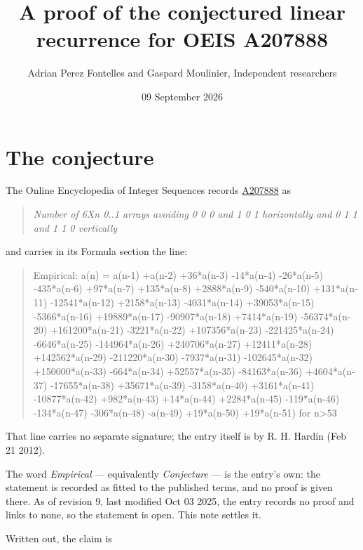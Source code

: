 \documentclass[11pt]{article}
\title{A proof of the conjectured linear recurrence for OEIS A207888}
\author{Adrian Perez Fontelles and Gaspard Moulinier, Independent researchers}
\date{09 September 2026}
\theoremstyle{definition}
\begin{document}
\maketitle
\section{The conjecture}

The Online Encyclopedia of Integer Sequences records \href{https://oeis.org/A207888}{A207888} as

\begin{quote}\itshape Number of 6Xn 0..1 arrays avoiding 0 0 0 and 1 0 1 horizontally and 0 1 1 and 1 1 0 vertically\end{quote}

and carries in its Formula section the line:

\begin{quote}\ttfamily Empirical: a(n) = a(n-1) +a(n-2) +36*a(n-3) -14*a(n-4) -26*a(n-5) -435*a(n-6) +97*a(n-7) +135*a(n-8) +2888*a(n-9) -540*a(n-10) +131*a(n-11) -12541*a(n-12) +2158*a(n-13) -4031*a(n-14) +39053*a(n-15) -5366*a(n-16) +19889*a(n-17) -90907*a(n-18) +7414*a(n-19) -56374*a(n-20) +161200*a(n-21) -3221*a(n-22) +107356*a(n-23) -221425*a(n-24) -6646*a(n-25) -144964*a(n-26) +240706*a(n-27) +12411*a(n-28) +142562*a(n-29) -211220*a(n-30) -7937*a(n-31) -102645*a(n-32) +150000*a(n-33) -664*a(n-34) +52557*a(n-35) -84163*a(n-36) +4604*a(n-37) -17655*a(n-38) +35671*a(n-39) -3158*a(n-40) +3161*a(n-41) -10877*a(n-42) +982*a(n-43) +14*a(n-44) +2284*a(n-45) -119*a(n-46) -134*a(n-47) -306*a(n-48) -a(n-49) +19*a(n-50) +19*a(n-51) for n>53\end{quote}

That line carries no separate signature; the entry itself is by R. H. Hardin (Feb 21 2012).

The word {\itshape Empirical} --- equivalently {\itshape Conjecture} --- is the entry's own: the statement is recorded as fitted to the published terms, and no proof is given there. As of revision 9, last modified Oct 03 2025, the entry records no proof and links to none, so the statement is open. This note settles it.

Written out, the claim is
\end{document}

